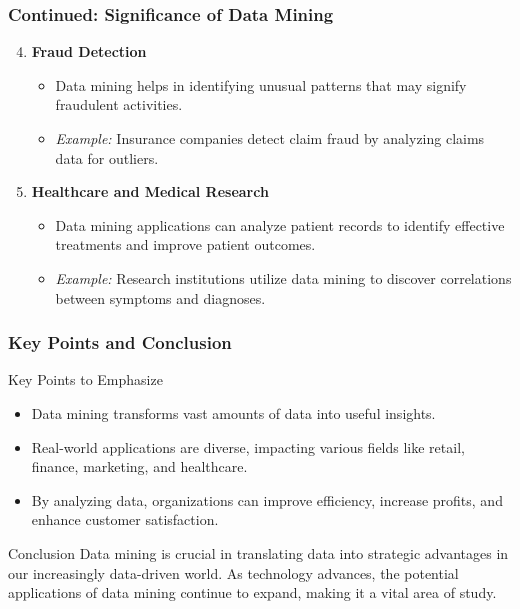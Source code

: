 \documentclass{beamer}
\begin{document}
\begin{frame}[fragile]
    \frametitle{Continued: Significance of Data Mining}
    \begin{enumerate}
        \setcounter{enumi}{3}
        \item \textbf{Fraud Detection}
        \begin{itemize}
            \item Data mining helps in identifying unusual patterns that may signify fraudulent activities.
            \item \textit{Example:} Insurance companies detect claim fraud by analyzing claims data for outliers.
        \end{itemize}

        \item \textbf{Healthcare and Medical Research}
        \begin{itemize}
            \item Data mining applications can analyze patient records to identify effective treatments and improve patient outcomes.
            \item \textit{Example:} Research institutions utilize data mining to discover correlations between symptoms and diagnoses.
        \end{itemize}
    \end{enumerate}
\end{frame}

\begin{frame}[fragile]
    \frametitle{Key Points and Conclusion}
    \begin{block}{Key Points to Emphasize}
        \begin{itemize}
            \item Data mining transforms vast amounts of data into useful insights.
            \item Real-world applications are diverse, impacting various fields like retail, finance, marketing, and healthcare.
            \item By analyzing data, organizations can improve efficiency, increase profits, and enhance customer satisfaction.
        \end{itemize}
    \end{block}

    \begin{block}{Conclusion}
        Data mining is crucial in translating data into strategic advantages in our increasingly data-driven world. As technology advances, the potential applications of data mining continue to expand, making it a vital area of study.
    \end{block}
\end{frame}
\end{document}
